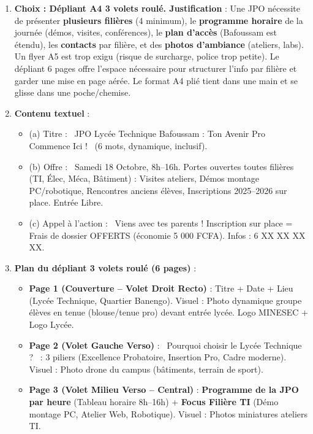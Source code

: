 \documentclass[11pt]{article}
\begin{document}
\begin{corrige}
\begin{enumerate}
\item \textbf{Choix : Dépliant A4 3 volets roulé. Justification} : Une JPO nécessite de présenter \textbf{plusieurs filières} (4 minimum), le \textbf{programme horaire} de la journée (démos, visites, conférences), le \textbf{plan d'accès} (Bafoussam est étendu), les \textbf{contacts} par filière, et des \textbf{photos d'ambiance} (ateliers, labs). Un flyer A5 est trop exigu (risque de surcharge, police trop petite). Le dépliant 6 pages offre l'espace nécessaire pour structurer l'info par filière et garder une mise en page aérée. Le format A4 plié tient dans une main et se glisse dans une poche/chemise.
\item \textbf{Contenu textuel} :
  \begin{itemize}
  \item (a) Titre : \og~JPO Lycée Technique Bafoussam : Ton Avenir Pro Commence Ici !~\fg{} (6 mots, dynamique, inclusif).
  \item (b) Offre : \og~Samedi 18 Octobre, 8h--16h. Portes ouvertes toutes filières (TI, Élec, Méca, Bâtiment) : Visites ateliers, Démos montage PC/robotique, Rencontres anciens élèves, Inscriptions 2025--2026 sur place. Entrée Libre.~\fg{}
  \item (c) Appel à l'action : \og~Viens avec tes parents ! Inscription sur place = Frais de dossier OFFERTS (économie 5 000 FCFA). Infos : 6 XX XX XX XX.~\fg{}
  \end{itemize}
\item \textbf{Plan du dépliant 3 volets roulé (6 pages)} :
  \begin{itemize}
  \item \textbf{Page 1 (Couverture -- Volet Droit Recto)} : Titre + Date + Lieu (Lycée Technique, Quartier Banengo). Visuel : Photo dynamique groupe élèves en tenue (blouse/tenue pro) devant entrée lycée. Logo MINESEC + Logo Lycée.
  \item \textbf{Page 2 (Volet Gauche Verso)} : \og~Pourquoi choisir le Lycée Technique ?~\fg{} : 3 piliers (Excellence Probatoire, Insertion Pro, Cadre moderne). Visuel : Photo drone du campus (bâtiments, terrain de sport).
  \item \textbf{Page 3 (Volet Milieu Verso -- Central)} : \textbf{Programme de la JPO par heure} (Tableau horaire 8h--16h) + \textbf{Focus Filière TI} (Démo montage PC, Atelier Web, Robotique). Visuel : Photos miniatures ateliers TI.

\end{itemize}
\end{enumerate}
\end{corrige}
\end{document}
